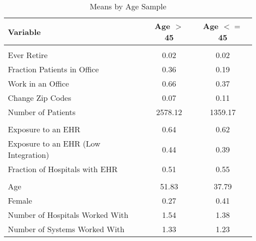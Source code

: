 \begin{table}[h]

\caption{Means by Age Sample}
\label{tab:sumstats2}
\centering
\begin{tabular}[t]{lcc}
\toprule
Variable & Age $>$ 45 & Age $<=$ 45\\
\midrule
\addlinespace[0.3em]
\multicolumn{3}{l}{\textbf{Outcomes}}\\
\hspace{1em}Ever Retire & 0.02 & 0.02\\
\hspace{1em}Fraction Patients in Office & 0.36 & 0.19\\
\hspace{1em}Work in an Office & 0.66 & 0.37\\
\hspace{1em}Change Zip Codes & 0.07 & 0.11\\
\hspace{1em}Number of Patients & 2578.12 & 1359.17\\
\addlinespace[0.3em]
\multicolumn{3}{l}{\textbf{Treatment}}\\
\hspace{1em}Exposure to an EHR & 0.64 & 0.62\\
\hspace{1em}Exposure to an EHR (Low Integration) & 0.44 & 0.39\\
\hspace{1em}Fraction of Hospitals with EHR & 0.51 & 0.55\\
\addlinespace[0.3em]
\multicolumn{3}{l}{\textbf{Characteristics}}\\
\hspace{1em}Age & 51.83 & 37.79\\
\hspace{1em}Female & 0.27 & 0.41\\
\hspace{1em}Number of Hospitals Worked With & 1.54 & 1.38\\
\hspace{1em}Number of Systems Worked With & 1.33 & 1.23\\
\bottomrule
\end{tabular}
\end{table}
